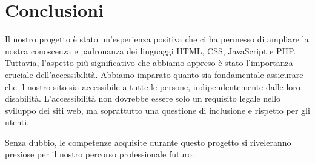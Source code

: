 \section{Conclusioni}

Il nostro progetto è stato un'esperienza positiva che ci ha permesso di ampliare la nostra conoscenza e padronanza dei linguaggi HTML, CSS, JavaScript e PHP. Tuttavia, l'aspetto più significativo che abbiamo appreso è stato l'importanza cruciale dell'accessibilità. Abbiamo imparato quanto sia fondamentale assicurare che il nostro sito sia accessibile a tutte le persone, indipendentemente dalle loro disabilità.
L'accessibilità non dovrebbe essere solo un requisito legale nello sviluppo dei siti web, ma soprattutto una questione di inclusione e rispetto per gli utenti.

Senza dubbio, le competenze acquisite durante questo progetto si riveleranno preziose per il nostro percorso professionale futuro.